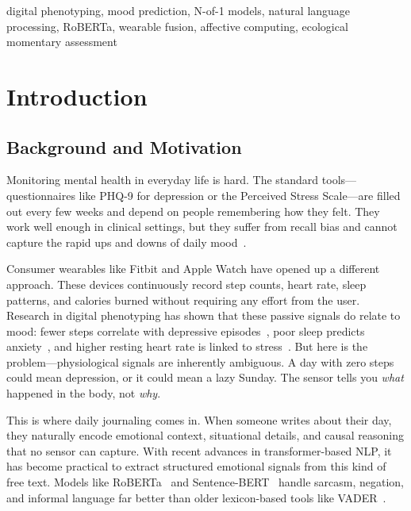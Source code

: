 \documentclass[conference]{IEEEtran}
\begin{document}
\begin{IEEEkeywords}
digital phenotyping, mood prediction, N-of-1 models, natural language processing, RoBERTa, wearable fusion, affective computing, ecological momentary assessment
\end{IEEEkeywords}

\section{Introduction}

\subsection{Background and Motivation}

Monitoring mental health in everyday life is hard. The standard tools---questionnaires like PHQ-9 for depression or the Perceived Stress Scale---are filled out every few weeks and depend on people remembering how they felt. They work well enough in clinical settings, but they suffer from recall bias and cannot capture the rapid ups and downs of daily mood~\cite{shiffman2008}.

Consumer wearables like Fitbit and Apple Watch have opened up a different approach. These devices continuously record step counts, heart rate, sleep patterns, and calories burned without requiring any effort from the user. Research in digital phenotyping has shown that these passive signals do relate to mood: fewer steps correlate with depressive episodes~\cite{saeb2015}, poor sleep predicts anxiety~\cite{gruber2011}, and higher resting heart rate is linked to stress~\cite{kim2018}. But here is the problem---physiological signals are inherently ambiguous. A day with zero steps could mean depression, or it could mean a lazy Sunday. The sensor tells you \textit{what} happened in the body, not \textit{why}.

This is where daily journaling comes in. When someone writes about their day, they naturally encode emotional context, situational details, and causal reasoning that no sensor can capture. With recent advances in transformer-based NLP, it has become practical to extract structured emotional signals from this kind of free text. Models like RoBERTa~\cite{liu2019roberta} and Sentence-BERT~\cite{reimers2019sbert} handle sarcasm, negation, and informal language far better than older lexicon-based tools like VADER~\cite{hutto2014vader}.
\end{document}
